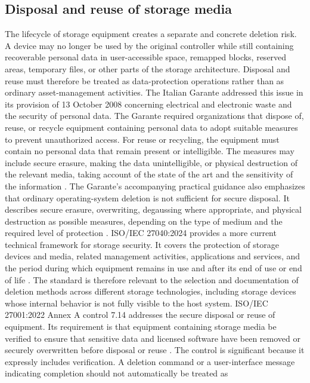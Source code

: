 \subsection{Disposal and reuse of storage media}
The lifecycle of storage equipment creates a separate and concrete deletion risk. A device may no longer be used by the original 
controller while still containing recoverable personal data in user-accessible space, remapped blocks, reserved areas, temporary 
files, or other parts of the storage architecture. Disposal and reuse must therefore be treated as data-protection operations 
rather than as ordinary asset-management activities. The Italian Garante addressed this issue in its provision of 13 October 
2008 concerning electrical and electronic waste and the security of personal data. The Garante required organizations that dispose 
of, reuse, or recycle equipment containing personal data to adopt suitable measures to prevent unauthorized access. For reuse or 
recycling, the equipment must contain no personal data that remain present or intelligible. The measures may include secure erasure, 
making the data unintelligible, or physical destruction of the relevant media, taking account of the state of the art and the 
sensitivity of the information \cite{garante2008_electronic_waste}. The Garante’s accompanying practical guidance also emphasizes 
that ordinary operating-system deletion is not sufficient for secure disposal. It describes secure erasure, overwriting, degaussing
 where appropriate, and physical destruction as possible measures, depending on the type of medium and the required level of 
 protection \cite{garante2008_secure_deletion}. ISO/IEC 27040:2024 provides a more current technical framework for storage 
 security. It covers the protection of storage devices and media, related management activities, applications and services, and the 
 period during which equipment remains in use and after its end of use or end of life \cite{iso27040_2024}. The standard is therefore 
 relevant to the  selection and documentation of deletion methods across different storage technologies, including storage devices whose 
 internal  behavior is not fully visible to the host system. ISO/IEC 27001:2022 Annex A control 7.14 addresses the secure disposal or 
 reuse of equipment. Its requirement is that equipment containing storage media be verified to ensure that sensitive data and licensed 
 software have been removed or securely overwritten before disposal or reuse \cite{iso27001_2022}. The control is significant because it expressly 
 includes verification. A deletion command or a user-interface message indicating completion should not automatically be treated as 
